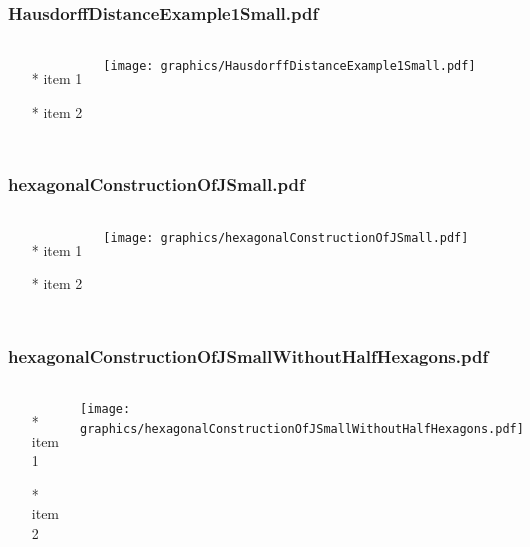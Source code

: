 \begin{frame} \frametitle{HausdorffDistanceExample1Small.pdf}
    \begin{columns}[c]
        \begin{itemize}
            \item[*] item 1
            \item[*] item 2
        \end{itemize}
        \begin{minipage}{\linewidth}
            \begin{center}
            \texttt{[image: graphics/HausdorffDistanceExample1Small.pdf]}
            \label{gfx:HausdorffDistanceExample1Small.pdf}
            \end{center}
        \end{minipage}
    \end{columns}
\end{frame}
\begin{frame} \frametitle{hexagonalConstructionOfJSmall.pdf}
    \begin{columns}[c]
        \begin{itemize}
            \item[*] item 1
            \item[*] item 2
        \end{itemize}
        \begin{minipage}{\linewidth}
            \begin{center}
            \texttt{[image: graphics/hexagonalConstructionOfJSmall.pdf]}
            \label{gfx:hexagonalConstructionOfJSmall.pdf}
            \end{center}
        \end{minipage}
    \end{columns}
\end{frame}
\begin{frame} \frametitle{hexagonalConstructionOfJSmallWithoutHalfHexagons.pdf}
    \begin{columns}[c]
        \begin{itemize}
            \item[*] item 1
            \item[*] item 2
        \end{itemize}
        \begin{minipage}{\linewidth}
            \begin{center}
            \texttt{[image: graphics/hexagonalConstructionOfJSmallWithoutHalfHexagons.pdf]}
            \label{gfx:hexagonalConstructionOfJSmallWithoutHalfHexagons.pdf}
            \end{center}
        \end{minipage}
    \end{columns}
\end{frame}
